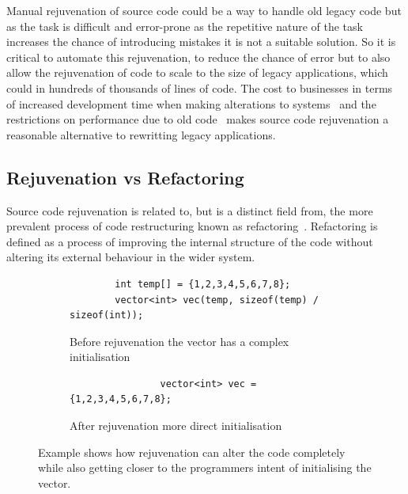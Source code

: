 \documentclass[bsc,frontabs,singlespacing,twoside,parskip,deptreport]{infthesis}
\begin{document}
Manual rejuvenation of source code could be a way to handle old legacy code but as the task is difficult and error-prone as the repetitive nature of the task increases the chance of introducing mistakes it is not a suitable solution. So it is critical to automate this rejuvenation, to reduce the chance of error but to also allow the rejuvenation of code to scale to the size of legacy applications, which could in hundreds of thousands of lines of code. The cost to businesses in terms of increased development time when making alterations to systems~\cite{LEGACY_MOD} and the restrictions on performance due to old code~\cite{HPC} makes source code rejuvenation a reasonable alternative to rewritting legacy applications.

\subsection{Rejuvenation vs Refactoring}

Source code rejuvenation is related to, but is a distinct field from, the more prevalent process of code restructuring known as refactoring~\cite{REFACTOR_BOOK}. Refactoring is defined as a process of improving the internal structure of the code without altering its external behaviour in the wider system. 

\begin{figure}[H]
    
    \begin{subfigure}[h]{\textwidth}
        \begin{verbatim}
        int temp[] = {1,2,3,4,5,6,7,8};
        vector<int> vec(temp, sizeof(temp) / sizeof(int));
        \end{verbatim}
        \caption{Before rejuvenation the vector has a complex initialisation}
        \vspace{0.2cm}
        \label{fig:exp-intent-before}
    \end{subfigure}
    
    \begin{subfigure}[h]{\textwidth}
        \centering
        \begin{verbatim}
                vector<int> vec = {1,2,3,4,5,6,7,8};
        \end{verbatim}
        \caption{After rejuvenation more direct initialisation}
        \label{fig:exp-intent-after}
    \end{subfigure}

    \caption{Example shows how rejuvenation can alter the code completely while also getting closer to the programmers intent of initialising the vector.}
    \label{fig:exp-intent}
\end{figure}
\end{document}
